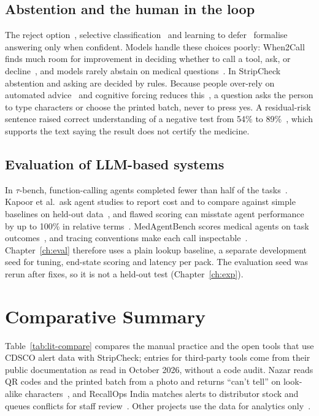 \subsection{Abstention and the human in the loop}
The reject option~\cite{chow1970reject}, selective classification~\cite{geifman2017selective} and learning to defer~\cite{madras2018defer,mozannar2020defer} formalise answering only when confident. Models handle these choices poorly: When2Call finds much room for improvement in deciding whether to call a tool, ask, or decline~\cite{ross2025when2call}, and models rarely abstain on medical questions~\cite{cocchieri2026abstain}. In StripCheck abstention and asking are decided by rules. Because people over-rely on automated advice~\cite{parasuraman2010complacency} and cognitive forcing reduces this~\cite{bucinca2021trust}, a question asks the person to type characters or choose the printed batch, never to press yes. A residual-risk sentence raised correct understanding of a negative test from 54\% to 89\%~\cite{batteux2022residual}, which supports the \NLISTED{} text saying the result does not certify the medicine.

\subsection{Evaluation of LLM-based systems}
In $\tau$-bench, function-calling agents completed fewer than half of the tasks~\cite{yao2024taubench}. Kapoor et al.\ ask agent studies to report cost and to compare against simple baselines on held-out data~\cite{kapoor2024agents}, and flawed scoring can misstate agent performance by up to 100\% in relative terms~\cite{zhu2025agentic}. MedAgentBench scores medical agents on task outcomes~\cite{jiang2025medagentbench}, and tracing conventions make each call inspectable~\cite{otel2026genai,arize2026openinference}. Chapter~\ref{ch:eval} therefore uses a plain lookup baseline, a separate development seed for tuning, end-state scoring and latency per pack. The evaluation seed was rerun after fixes, so it is not a held-out test (Chapter~\ref{ch:exp}).

\section{Comparative Summary}
\label{sec:lit-comparative-summary}

Table~\ref{tab:lit-compare} compares the manual practice and the open tools that use CDSCO alert data with StripCheck; entries for third-party tools come from their public documentation as read in October 2026, without a code audit. Nazar reads QR codes and the printed batch from a photo and returns ``can't tell'' on look-alike characters~\cite{rastogi2026nazar}, and RecallOps India matches alerts to distributor stock and queues conflicts for staff review~\cite{ibnweb32026recallops}. Other projects use the data for analytics only~\cite{swahub2026nsq,shayadmeri2026nsq,shaikfayaz2026medicine}.


